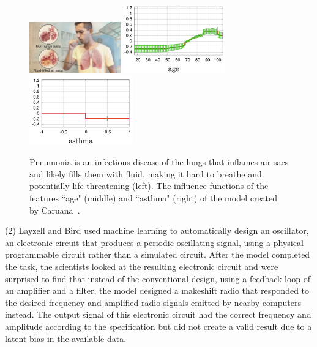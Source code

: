 \begin{figure}
\centering
\includegraphics[height=6em,valign=t]{tex/introduction/pneumonia.png}
\includegraphics[height=8em,valign=t]{tex/introduction/age.png}
\includegraphics[height=8em,valign=t]{tex/introduction/asthma.png}
\caption[Influence functions of Pneumonia model.]{
Pneumonia is an infectious disease of the lungs that inflames air sacs and likely fills them with fluid, making it hard to breathe and potentially life-threatening (left\footnotemark).
The influence functions of the features ``age" (middle) and ``asthma" (right) of the model created by Caruana~\etal\cite{Caruana:2015:IMH:2783258.2788613}.
}
\label{figs:pneumonia}
\end{figure}

\par \noindent (2)
Layzell and Bird \cite{Bird:2002:ERI:1251972.1252349} used machine learning to automatically design an oscillator, an electronic circuit that produces a periodic oscillating signal, using a physical programmable circuit rather than a simulated circuit. After the model completed the task, the scientists looked at the resulting electronic circuit and were surprised to find that instead of the conventional design, using a feedback loop of an amplifier and a filter, the model designed a makeshift radio that responded to the desired frequency and amplified radio signals emitted by nearby computers instead. The output signal of this electronic circuit had the correct frequency and amplitude according to the specification but did not create a valid result due to a latent bias in the available data.

